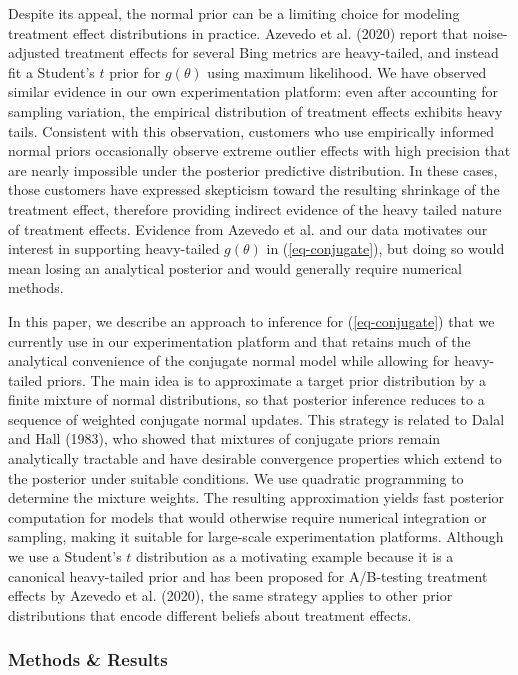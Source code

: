 \documentclass[11pt,letterpaper]{article}
\begin{document}
Despite its appeal, the normal prior can be a limiting choice for modeling
treatment effect distributions in practice. Azevedo et al. (2020)
report that noise-adjusted treatment effects for several Bing metrics are heavy-tailed,
and instead fit a Student's $t$ prior for $g(\theta)$ using maximum likelihood. We have observed similar evidence in our own experimentation platform: even after accounting for sampling variation, the empirical distribution of treatment effects exhibits heavy tails. Consistent with this observation, customers who use
empirically informed normal priors occasionally observe extreme outlier effects
with high precision that are nearly impossible under the posterior predictive
distribution. In these cases, those customers have expressed skepticism toward
the resulting shrinkage of the treatment effect, therefore providing indirect evidence of the 
heavy tailed nature of treatment effects. Evidence from Azevedo et al. and our data motivates our interest
in supporting heavy-tailed $g(\theta)$ in (\ref{eq-conjugate}),
but doing so would mean losing an analytical posterior and would generally
require numerical methods.

In this paper, we describe an approach to inference for
(\ref{eq-conjugate}) that we currently use in our experimentation platform and that retains much of the analytical convenience of the conjugate normal model while allowing for heavy-tailed priors. The
main idea is to approximate a target prior distribution by a finite
mixture of normal distributions, so that posterior inference reduces to a
sequence of weighted conjugate normal updates. This strategy is related to
Dalal and Hall (1983), who showed that mixtures of conjugate priors remain
analytically tractable and have desirable convergence properties
which extend to the posterior under suitable conditions. We use quadratic programming to determine the mixture weights. The resulting approximation yields fast posterior
computation for models that would otherwise require numerical integration
or sampling, making it suitable for large-scale experimentation platforms.
Although we use a Student's $t$ distribution as a motivating example
because it is a canonical heavy-tailed prior and has been proposed for
A/B-testing treatment effects by Azevedo et al. (2020), the same strategy
applies to other prior distributions that encode different beliefs about
treatment effects.  

\subsubsection{Methods \& Results}\label{methods-results}
\end{document}
